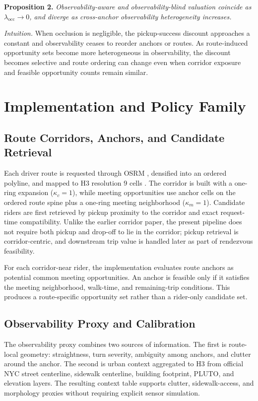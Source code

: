 \documentclass[journal]{IEEEtran}
\begin{document}
\textbf{Proposition 2.} \emph{Observability-aware and observability-blind valuation coincide as $\lambda_{\mathrm{occ}}\rightarrow 0$, and diverge as cross-anchor observability heterogeneity increases.}

\emph{Intuition.} When occlusion is negligible, the pickup-success discount approaches a constant and observability ceases to reorder anchors or routes. As route-induced opportunity sets become more heterogeneous in observability, the discount becomes selective and route ordering can change even when corridor exposure and feasible opportunity counts remain similar.
\section{Implementation and Policy Family}
\subsection{Route Corridors, Anchors, and Candidate Retrieval}
Each driver route is requested through OSRM \cite{osrmapi}, densified into an ordered polyline, and mapped to H3 resolution 9 cells \cite{h3docs}. The corridor is built with a one-ring expansion ($\kappa_c=1$), while meeting opportunities use anchor cells on the ordered route spine plus a one-ring meeting neighborhood ($\kappa_m=1$). Candidate riders are first retrieved by pickup proximity to the corridor and exact request-time compatibility. Unlike the earlier corridor paper, the present pipeline does not require both pickup and drop-off to lie in the corridor; pickup retrieval is corridor-centric, and downstream trip value is handled later as part of rendezvous feasibility.

For each corridor-near rider, the implementation evaluates route anchors as potential common meeting opportunities. An anchor is feasible only if it satisfies the meeting neighborhood, walk-time, and remaining-trip conditions. This produces a route-specific opportunity set rather than a rider-only candidate set.

\subsection{Observability Proxy and Calibration}
The observability proxy combines two sources of information. The first is route-local geometry: straightness, turn severity, ambiguity among anchors, and clutter around the anchor. The second is urban context aggregated to H3 from official NYC street centerline, sidewalk centerline, building footprint, PLUTO, and elevation layers. The resulting context table supports clutter, sidewalk-access, and morphology proxies without requiring explicit sensor simulation.
\end{document}
